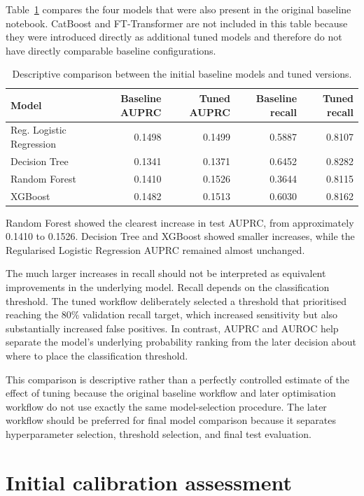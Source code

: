 \documentclass[11pt,a4paper]{article}
\begin{document}
Table~\ref{tab:baseline_comparison} compares the four models that were also present in the original baseline notebook. CatBoost and FT-Transformer are not included in this table because they were introduced directly as additional tuned models and therefore do not have directly comparable baseline configurations.

\begin{table}[htbp]
\centering
\caption{Descriptive comparison between the initial baseline models and tuned versions.}
\label{tab:baseline_comparison}
\begin{tabular}{lrrrr}
\toprule
Model & Baseline AUPRC & Tuned AUPRC & Baseline recall & Tuned recall \\
\midrule
Reg. Logistic Regression & 0.1498 & 0.1499 & 0.5887 & 0.8107 \\
Decision Tree             & 0.1341 & 0.1371 & 0.6452 & 0.8282 \\
Random Forest             & 0.1410 & 0.1526 & 0.3644 & 0.8115 \\
XGBoost                   & 0.1482 & 0.1513 & 0.6030 & 0.8162 \\
\bottomrule
\end{tabular}
\end{table}

Random Forest showed the clearest increase in test AUPRC, from approximately 0.1410 to 0.1526. Decision Tree and XGBoost showed smaller increases, while the Regularised Logistic Regression AUPRC remained almost unchanged.

The much larger increases in recall should not be interpreted as equivalent improvements in the underlying model. Recall depends on the classification threshold. The tuned workflow deliberately selected a threshold that prioritised reaching the 80\% validation recall target, which increased sensitivity but also substantially increased false positives. In contrast, AUPRC and AUROC help separate the model's underlying probability ranking from the later decision about where to place the classification threshold.

This comparison is descriptive rather than a perfectly controlled estimate of the effect of tuning because the original baseline workflow and later optimisation workflow do not use exactly the same model-selection procedure. The later workflow should be preferred for final model comparison because it separates hyperparameter selection, threshold selection, and final test evaluation.

\section{Initial calibration assessment}
\end{document}
